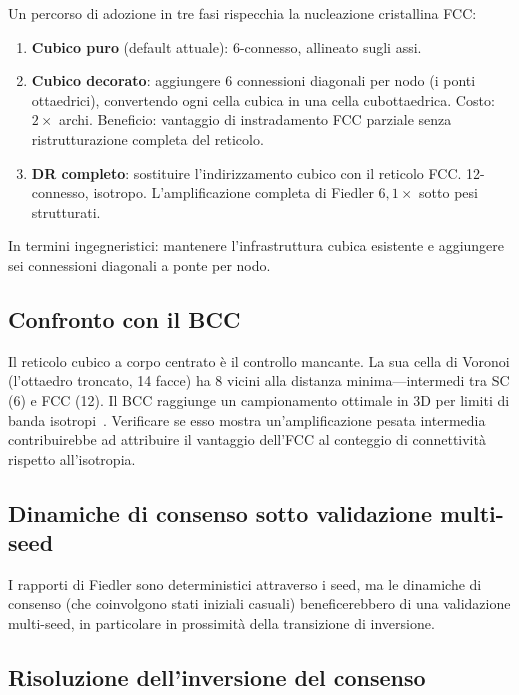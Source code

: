 \documentclass[11pt]{article}
\begin{document}
Un percorso di adozione in tre fasi rispecchia la nucleazione
cristallina FCC:

\begin{enumerate}
  \item \textbf{Cubico puro} (default attuale): 6-connesso, allineato
    sugli assi.
  \item \textbf{Cubico decorato}: aggiungere 6 connessioni diagonali
    per nodo (i ponti ottaedrici), convertendo ogni cella cubica in una
    cella cubottaedrica. Costo: $2\times$ archi. Beneficio: vantaggio
    di instradamento FCC parziale senza ristrutturazione completa del
    reticolo.
  \item \textbf{DR completo}: sostituire l'indirizzamento cubico con il
    reticolo FCC. 12-connesso, isotropo. L'amplificazione completa di
    Fiedler $6{,}1\times$ sotto pesi strutturati.
\end{enumerate}

In termini ingegneristici: mantenere l'infrastruttura cubica esistente
e aggiungere sei connessioni diagonali a ponte per nodo.

\subsection{Confronto con il BCC}

Il reticolo cubico a corpo centrato \`e il controllo mancante. La sua
cella di Voronoi (l'ottaedro troncato, 14 facce) ha 8 vicini alla
distanza minima---intermedi tra SC (6) e FCC (12). Il BCC raggiunge un
campionamento ottimale in 3D per limiti di banda
isotropi~\cite{petersen1962}. Verificare se esso mostra
un'amplificazione pesata intermedia contribuirebbe ad attribuire il
vantaggio dell'FCC al conteggio di connettivit\`a rispetto
all'isotropia.

\subsection{Dinamiche di consenso sotto validazione multi-seed}

I rapporti di Fiedler sono deterministici attraverso i seed, ma le
dinamiche di consenso (che coinvolgono stati iniziali casuali)
beneficerebbero di una validazione multi-seed, in particolare in
prossimit\`a della transizione di inversione.

\subsection{Risoluzione dell'inversione del consenso}
\end{document}
